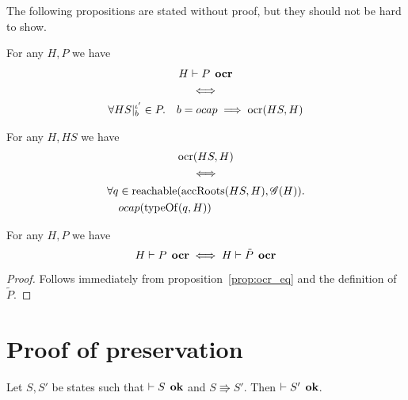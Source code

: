 The following propositions are stated without proof, but they should not be hard
to show.
\begin{proposition} \label{prop:ocr_eq}
  For any $H, P$ we have
  \begin{equation*}
    \begin{gathered}
      H \vdash P \:\: \mbox{\bf ocr} \\
      \iff \\
      \forall HS|_b^{\iota'} \in P. \quad
         b = \mbox{$ocap$} \implies \mbox{$\mathrm{ocr}$}(HS, H)
    \end{gathered}
  \end{equation*}
\end{proposition}

\begin{proposition} \label{prop:ocrloc_eq}
  For any $H, HS$ we have
  \begin{equation*}
    \begin{gathered}
      \mbox{$\mathrm{ocr}$}(HS, H) \\
      \iff  \\
      \begin{aligned}
        \forall q &\in \mbox{$\mathrm{reachable}$}(\mbox{$\mathrm{accRoots}$}(HS, H), \mathscr{G}(H)). \\
        & \mbox{$ocap$}(\mbox{$\mathrm{typeOf}$}(q, H))
      \end{aligned}
    \end{gathered}
  \end{equation*}
\end{proposition}

\begin{proposition} \label{prop:ocrtilde_eq}
  For any $H, P$ we have
  \begin{equation*}
    H \vdash P \:\: \mbox{\bf ocr} \iff H \vdash \tilde{P} \:\: \mbox{\bf ocr}
  \end{equation*}
\end{proposition}
\begin{proof}
  Follows immediately from proposition~\ref{prop:ocr_eq} and the definition of
  $\tilde{P}$.
\end{proof}


\section{Proof of preservation}
\label{sec:proof_of_preservation}

\begin{theorem*}[Preservation]
  Let $S, S'$ be states such that $\vdash S \:\: \mbox{\bf ok}$ and $S \Rrightarrow
  S'$. Then $\vdash S' \:\: \mbox{\bf ok}$.
\end{theorem*}


